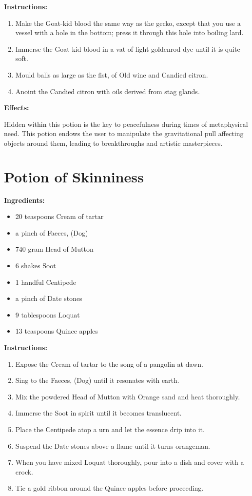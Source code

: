\documentclass{article}
\begin{document}
\textbf{Instructions:}

\begin{enumerate}
  \item Make the Goat-kid blood the same way as the gecko, except that you use a vessel with a hole in the bottom; press it through this hole into boiling lard.
  \item Immerse the Goat-kid blood in a vat of light goldenrod dye until it is quite soft.
  \item Mould balls as large as the fist, of Old wine and Candied citron.
  \item Anoint the Candied citron with oils derived from stag glands.
\end{enumerate}

\textbf{Effects:}

Hidden within this potion is the key to peacefulness during times of metaphysical need. This potion endows the user to manipulate the gravitational pull affecting objects around them, leading to breakthroughs and artistic masterpieces.

\newpage
\section*{Potion of Skinniness}

\textbf{Ingredients:}

\begin{itemize}
  \item 20 teaspoons Cream of tartar
  \item a pinch of Faeces, (Dog)
  \item 740 gram Head of Mutton
  \item 6 shakes Soot
  \item 1 handful Centipede
  \item a pinch of Date stones
  \item 9 tablespoons Loquat
  \item 13 teaspoons Quince apples
\end{itemize}

\textbf{Instructions:}

\begin{enumerate}
  \item Expose the Cream of tartar to the song of a pangolin at dawn.
  \item Sing to the Faeces, (Dog) until it resonates with earth.
  \item Mix the powdered Head of Mutton with Orange sand and heat thoroughly.
  \item Immerse the Soot in spirit until it becomes translucent.
  \item Place the Centipede atop a urn and let the essence drip into it.
  \item Suspend the Date stones above a flame until it turns orangeman.
  \item When you have mixed Loquat thoroughly, pour into a dish and cover with a crock.
  \item Tie a gold ribbon around the Quince apples before proceeding.
\end{enumerate}
\end{document}
